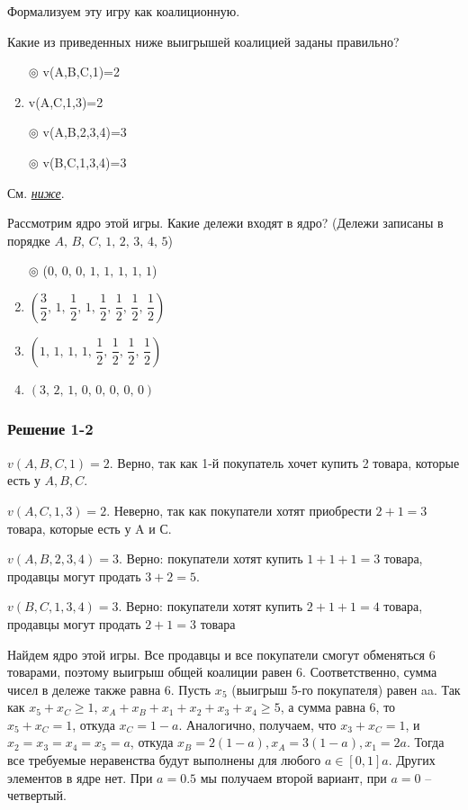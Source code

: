 	Формализуем эту игру как коалиционную.
	
	Какие из приведенных ниже выигрышей коалицией заданы правильно?
	
	\begin{enumerate}[label=$\circ$]
		\item[$\circledcirc$] v(A,B,C,1)=2
		\item v(A,C,1,3)=2
		\item[$\circledcirc$] v(A,B,2,3,4)=3
		\item[$\circledcirc$] v(B,C,1,3,4)=3
	\end{enumerate}

	\solution См. \hyperref[control:sol2]{\textit{ниже}}.

	\task
	Рассмотрим ядро этой игры. Какие дележи входят в ядро? (Дележи записаны в порядке $A,\,B,\,C,\,1,\,2,\,3,\,4,\,5$)
	
	\begin{enumerate}[label=$\circ$]
		\item[$\circledcirc$] ($0,\,0,\,0,\,1,\,1,\,1,\,1,\,1$)
		
		
		\item $\left(\dfrac{3}{2},\,1,\,\dfrac{1}{2},\,1,\,\dfrac{1}{2},\,\dfrac{1}{2},\,\dfrac{1}{2},\,\dfrac{1}{2}\right)$
		
		\item $\left(1,\,1,\,1,\,1,\,\dfrac{1}{2},\,\dfrac{1}{2},\,\dfrac{1}{2},\,\dfrac{1}{2}\right)$
		
		\item $(3,\,2,\,1,\,0,\,0,\,0,\,0,\,0)$
	\end{enumerate}

	\subsubsection*{Решение 1-2}
	$v(A,B,C,1)=2$. Верно, так как 1-й покупатель хочет купить 2 товара, которые есть у $A,B,C$.
	
	$v(A,C,1,3)=2$. Неверно, так как покупатели хотят приобрести $2+1=3$ товара, которые есть у A и С.
	
	$v(A,B,2,3,4)=3$. Верно: покупатели хотят купить $1+1+1=3$ товара, продавцы могут продать $3+2=5$.
	
	$v(B,C,1,3,4)=3$. Верно: покупатели хотят купить $2+1+1=4$ товара, продавцы могут продать $2+1=3$ товара
	
	Найдем ядро этой игры. Все продавцы и все покупатели смогут обменяться 6 товарами, поэтому выигрыш общей коалиции равен 6. Соответственно, сумма чисел в дележе также равна 6. Пусть $x_5$ (выигрыш 5-го покупателя) равен aa. Так как $x_5+x_C \geq 1$, $x_A+x_B+x_1+x_2+x_3+x_4 \geq 5$, а сумма равна 6, то $x_5+x_C=1$, откуда $x_C=1-a$. Аналогично, получаем, что $x_3+x_C=1$, и $x_2=x_3=x_4=x_5=a$, откуда $x_B=2(1-a), x_A=3(1-a), x_1=2a$. Тогда все требуемые неравенства будут выполнены для любого $a\in [0,1]a$. Других элементов в ядре нет. При $a=0.5$ мы получаем второй вариант, при $a=0$ --четвертый.

